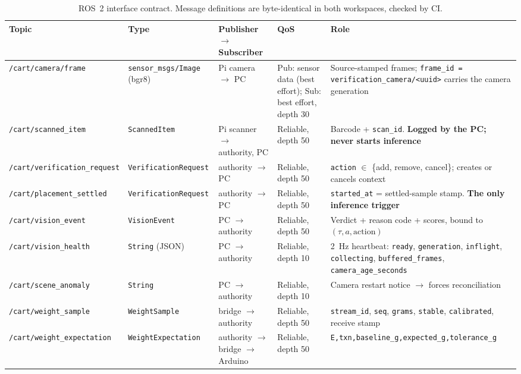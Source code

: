 \documentclass[conference]{IEEEtran}
\begin{document}
\begin{table}[!t]
\caption{ROS~2 interface contract. Message definitions are byte-identical in both workspaces, checked
by CI.}
\label{tab:topics}
\centering
\footnotesize
\renewcommand{\arraystretch}{1.15}
\begin{tabular}{@{}p{}p{}p{}p{}p{}@{}}
\toprule
Topic & Type & Publisher $\rightarrow$ Subscriber & QoS & Role \\
\midrule
\texttt{/cart/camera/frame} & \texttt{sensor\_msgs/Image} (bgr8) & Pi camera $\rightarrow$ PC & Pub: sensor data (best effort); Sub: best effort, depth 30 & Source-stamped frames; \texttt{frame\_id = verification\_camera/<uuid>} carries the camera generation \\
\texttt{/cart/scanned\_item} & \texttt{ScannedItem} & Pi scanner $\rightarrow$ authority, PC & Reliable, depth 50 & Barcode + \texttt{scan\_id}. \textbf{Logged by the PC; never starts inference} \\
\texttt{/cart/verification\_request} & \texttt{VerificationRequest} & authority $\rightarrow$ PC & Reliable, depth 50 & \texttt{action} $\in$ \{add, remove, cancel\}; creates or cancels context \\
\texttt{/cart/placement\_settled} & \texttt{VerificationRequest} & authority $\rightarrow$ PC & Reliable, depth 50 & \texttt{started\_at} = settled-sample stamp. \textbf{The only inference trigger} \\
\texttt{/cart/vision\_event} & \texttt{VisionEvent} & PC $\rightarrow$ authority & Reliable, depth 50 & Verdict + reason code + scores, bound to $(\tau,a,\text{action})$ \\
\texttt{/cart/vision\_health} & \texttt{String} (JSON) & PC $\rightarrow$ authority & Reliable, depth 10 & 2~Hz heartbeat: \texttt{ready}, \texttt{generation}, \texttt{inflight}, \texttt{collecting}, \texttt{buffered\_frames}, \texttt{camera\_age\_seconds} \\
\texttt{/cart/scene\_anomaly} & \texttt{String} & PC $\rightarrow$ authority & Reliable, depth 10 & Camera restart notice $\rightarrow$ forces reconciliation \\
\texttt{/cart/weight\_sample} & \texttt{WeightSample} & bridge $\rightarrow$ authority & Reliable, depth 50 & \texttt{stream\_id}, \texttt{seq}, \texttt{grams}, \texttt{stable}, \texttt{calibrated}, receive stamp \\
\texttt{/cart/weight\_expectation} & \texttt{WeightExpectation} & authority $\rightarrow$ bridge $\rightarrow$ Arduino & Reliable, depth 50 & \texttt{E,txn,baseline\_g,expected\_g,tolerance\_g} \\

\end{tabular}
\end{table}
\end{document}
